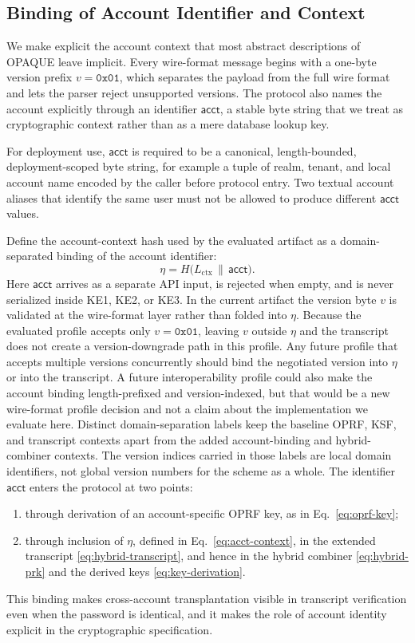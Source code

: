 \documentclass[preprint,12pt]{elsarticle}
\newcommand{\acct}{\mathsf{acct}}
\newcommand{\Label}[1]{L_{\mathrm{#1}}}
\theoremstyle{remark}
\begin{document}
\subsection{Binding of Account Identifier and Context}

We make explicit the account context that most abstract descriptions of OPAQUE leave implicit. Every wire-format message begins with a one-byte version prefix $v = \mathtt{0x01}$, which separates the payload from the full wire format and lets the parser reject unsupported versions. The protocol also names the account explicitly through an identifier $\acct$, a stable byte string that we treat as cryptographic context rather than as a mere database lookup key.

For deployment use, $\acct$ is required to be a canonical, length-bounded,
deployment-scoped byte string, for example a tuple of realm, tenant, and
local account name encoded by the caller before protocol entry. Two textual
account aliases that identify the same user must not be allowed to produce
different $\acct$ values.

Define the account-context hash used by the evaluated artifact as a
domain-separated binding of the account identifier:
\begin{equation}
  \eta =
  H\!\bigl(
    \Label{ctx} \,\|\, \acct
  \bigr).
  \label{eq:acct-context}
\end{equation}
Here $\acct$ arrives as a separate API input, is rejected when empty, and is never serialized inside KE1, KE2, or KE3. In the current artifact the version byte $v$ is validated at the wire-format layer rather than folded into $\eta$. Because the evaluated profile accepts only $v=\mathtt{0x01}$, leaving $v$ outside $\eta$ and the transcript does not create a version-downgrade path in this profile. Any future profile that accepts multiple versions concurrently should bind the negotiated version into $\eta$ or into the transcript. A future interoperability profile could also make the account binding length-prefixed and version-indexed, but that would be a new wire-format profile decision and not a claim about the implementation we evaluate here. Distinct domain-separation labels keep the baseline OPRF, KSF, and transcript contexts apart from the added account-binding and hybrid-combiner contexts. The version indices carried in those labels are local domain identifiers, not global version numbers for the scheme as a whole. The identifier $\acct$ enters the protocol at two points:
\begin{enumerate}
  \item through derivation of an account-specific OPRF key, as in
        Eq.~\eqref{eq:oprf-key};
  \item through inclusion of $\eta$, defined in
        Eq.~\eqref{eq:acct-context}, in the extended transcript
        \eqref{eq:hybrid-transcript}, and hence in the hybrid combiner
        \eqref{eq:hybrid-prk} and the derived keys
        \eqref{eq:key-derivation}.
\end{enumerate}
This binding makes cross-account transplantation visible in transcript
verification even when the password is identical, and it makes the role
of account identity explicit in the cryptographic specification.
\end{document}

